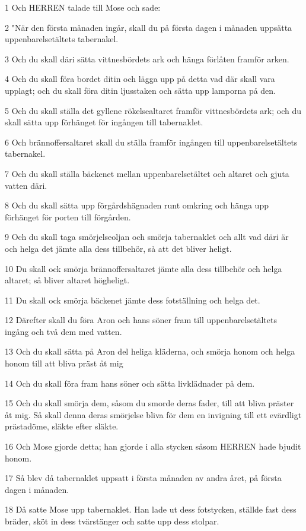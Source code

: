 \par 1 Och HERREN talade till Mose och sade:
\par 2 "När den första månaden ingår, skall du på första dagen i månaden uppsätta uppenbarelsetältets tabernakel.
\par 3 Och du skall däri sätta vittnesbördets ark och hänga förlåten framför arken.
\par 4 Och du skall föra bordet ditin och lägga upp på detta vad där skall vara upplagt; och du skall föra ditin ljusstaken och sätta upp lamporna på den.
\par 5 Och du skall ställa det gyllene rökelsealtaret framför vittnesbördets ark; och du skall sätta upp förhänget för ingången till tabernaklet.
\par 6 Och brännoffersaltaret skall du ställa framför ingången till uppenbarelsetältets tabernakel.
\par 7 Och du skall ställa bäckenet mellan uppenbarelsetältet och altaret och gjuta vatten däri.
\par 8 Och du skall sätta upp förgårdshägnaden runt omkring och hänga upp förhänget för porten till förgården.
\par 9 Och du skall taga smörjelseoljan och smörja tabernaklet och allt vad däri är och helga det jämte alla dess tillbehör, så att det bliver heligt.
\par 10 Du skall ock smörja brännoffersaltaret jämte alla dess tillbehör och helga altaret; så bliver altaret högheligt.
\par 11 Du skall ock smörja bäckenet jämte dess fotställning och helga det.
\par 12 Därefter skall du föra Aron och hans söner fram till uppenbarelsetältets ingång och två dem med vatten.
\par 13 Och du skall sätta på Aron del heliga kläderna, och smörja honom och helga honom till att bliva präst åt mig
\par 14 Och du skall föra fram hans söner och sätta livklädnader på dem.
\par 15 Och du skall smörja dem, såsom du smorde deras fader, till att bliva präster åt mig. Så skall denna deras smörjelse bliva för dem en invigning till ett evärdligt prästadöme, släkte efter släkte.
\par 16 Och Mose gjorde detta; han gjorde i alla stycken såsom HERREN hade bjudit honom.
\par 17 Så blev då tabernaklet uppsatt i första månaden av andra året, på första dagen i månaden.
\par 18 Då satte Mose upp tabernaklet. Han lade ut dess fotstycken, ställde fast dess bräder, sköt in dess tvärstänger och satte upp dess stolpar.
